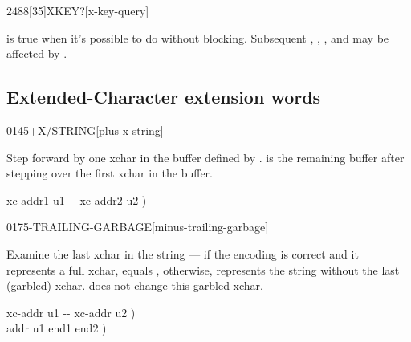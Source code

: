 \begin{worddef}[XKEYq]{2488}[35]{XKEY?}[x-key-query]%
\item {}

	 is true when it's possible to do  without
	blocking.  Subsequent , ,
	, and  may be affected
	by .

\end{worddef}


\subsection{Extended-Character extension words} %
\extended\vspace{1ex}

\begin{worddef}{0145}{+X/STRING}[plus-x-string]%
\item {}

	Step forward by one xchar in the buffer defined by .
	 is the remaining buffer after stepping over the
	first xchar in the buffer.

	\begin{implement} %
	\word{:}   xc-addr1 u1 -{}- xc-addr2 u2 ) \\
	\tab {}    \word{-}  \word{;}
	\end{implement}
\end{worddef}


\begin{worddef}{0175}{-TRAILING-GARBAGE}[minus-trailing-garbage]%
\item {}

	Examine the last xchar in the string  --- if the
	encoding is correct and it represents a full xchar,  equals
	, otherwise,  represents the string without the
	last (garbled) xchar.   does not change this
	garbled xchar.

	\begin{implement} %
	\word{:}   xc-addr u1 -{}- xc-addr u2 ) \\
	\tab {} \word{+}    addr u1 end1 end2 ) \\
	\tab {}    \word{-}  \word{+} \word{=}    \\
	\tab[2]  \\
	\tab {} \\
	\tab[2]    \word{-} \\
	\tab {} \word{;}
	\end{implement}
\end{worddef}


